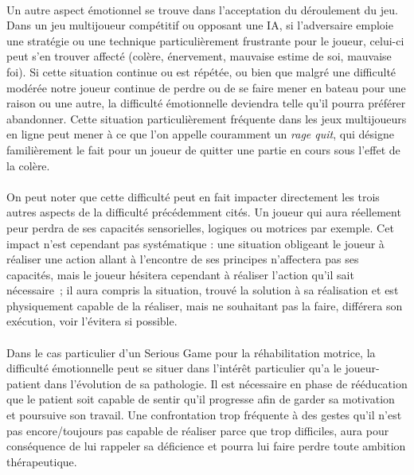 \paragraph{}
Un autre aspect émotionnel se trouve dans l’acceptation du déroulement du jeu. Dans un jeu multijoueur compétitif ou opposant une IA, si l’adversaire emploie une stratégie ou une technique particulièrement frustrante pour le joueur, celui-ci peut s’en trouver affecté (colère, énervement, mauvaise estime de soi, mauvaise foi). Si cette situation continue ou est répétée, ou bien que malgré une difficulté modérée notre joueur continue de perdre ou de se faire mener en bateau pour une raison ou une autre, la difficulté émotionnelle deviendra telle qu’il pourra préférer abandonner. Cette situation particulièrement fréquente dans les jeux multijoueurs en ligne peut mener à ce que l’on appelle couramment un \emph{rage quit}, qui désigne familièrement le fait pour un joueur de quitter une partie en cours sous l'effet de la colère.

\paragraph{}On peut noter que cette difficulté peut en fait impacter directement les trois autres aspects de la difficulté précédemment cités. Un joueur qui aura réellement peur perdra de ses capacités sensorielles, logiques ou motrices par exemple. Cet impact n’est cependant pas systématique : une situation obligeant le joueur à réaliser une action allant à l’encontre de ses principes n’affectera pas ses capacités, mais le joueur hésitera cependant à réaliser l’action qu’il sait nécessaire~; il aura compris la situation, trouvé la solution à sa réalisation et est physiquement capable de la réaliser, mais ne souhaitant pas la faire, différera son exécution, voir l’évitera si possible.

\paragraph{}Dans le cas particulier d’un Serious Game pour la réhabilitation motrice, la difficulté émotionnelle peut se situer dans l’intérêt particulier qu’a le joueur-patient dans l’évolution de sa pathologie. Il est nécessaire en phase de rééducation que le patient soit capable de sentir qu’il progresse afin de garder sa motivation et poursuive son travail. Une confrontation trop fréquente à des gestes qu’il n’est pas encore/toujours pas capable de réaliser parce que trop difficiles, aura pour conséquence de lui rappeler sa déficience et pourra lui faire perdre toute ambition thérapeutique.

